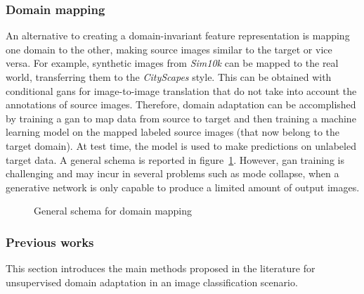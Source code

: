 \documentclass[%
    corpo=12pt,
    twoside,
    stile=classica,   
    tipotesi=magistrale,
    evenboxes,
    english
]{toptesi}
\begin{document}
\subsubsection{Domain mapping}
An alternative to creating a domain-invariant feature representation is mapping one domain to the other, making source images similar to the target or vice versa. For example, synthetic images from \textit{Sim10k} can be mapped to the real world, transferring them to the \textit{CityScapes} style. This can be obtained with conditional \glspl{gan} for image-to-image translation that do not take into account the annotations of source images. Therefore, domain adaptation can be accomplished by training a \gls{gan} to map data from source to target and then training a machine learning model on the mapped labeled source images (that now belong to the target domain). At test time, the model is used to make predictions on unlabeled target data. A general schema is reported in figure~\ref{fig:gan}. However, \gls{gan} training is challenging and may incur in several problems such as mode collapse, when a generative network is only capable to produce a limited amount of output images.

\begin{figure}[ht]
	\centering
	\caption{General schema for domain mapping\cite{wilson2020survey}}
	\label{fig:gan}
\end{figure}

\subsubsection{Previous works}
This section introduces the main methods proposed in the literature for unsupervised domain adaptation in an image classification scenario.
\end{document}
